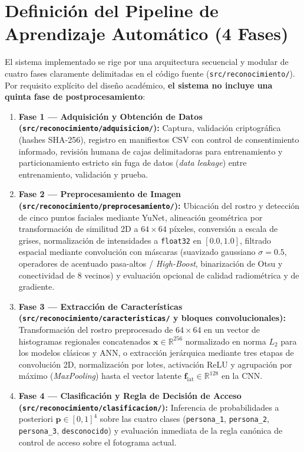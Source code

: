 \documentclass{article}
\begin{document}
\section{Definición del Pipeline de Aprendizaje Automático (4 Fases)}

El sistema implementado se rige por una arquitectura secuencial y modular de cuatro fases claramente delimitadas en el código fuente (\texttt{src/reconocimiento/}). Por requisito explícito del diseño académico, \textbf{el sistema no incluye una quinta fase de postprocesamiento}:

\begin{enumerate}
    \item \textbf{Fase 1 --- Adquisición y Obtención de Datos (\texttt{src/reconocimiento/adquisicion/}):} Captura, validación criptográfica (hashes SHA-256), registro en manifiestos CSV con control de consentimiento informado, revisión humana de cajas delimitadoras para entrenamiento y particionamiento estricto sin fuga de datos (\textit{data leakage}) entre entrenamiento, validación y prueba.
    \item \textbf{Fase 2 --- Preprocesamiento de Imagen (\texttt{src/reconocimiento/preprocesamiento/}):} Ubicación del rostro y detección de cinco puntos faciales mediante YuNet, alineación geométrica por transformación de similitud 2D a $64 \times 64$ píxeles, conversión a escala de grises, normalización de intensidades a \texttt{float32} en $[0.0, 1.0]$, filtrado espacial mediante convolución con máscaras (suavizado gaussiano $\sigma = 0.5$, operadores de acentuado pasa-altos / \textit{High-Boost}, binarización de Otsu y conectividad de 8 vecinos) y evaluación opcional de calidad radiométrica y de gradiente.
    \item \textbf{Fase 3 --- Extracción de Características (\texttt{src/reconocimiento/caracteristicas/} y bloques convolucionales):} Transformación del rostro preprocesado de $64 \times 64$ en un vector de histogramas regionales concatenados $\mathbf{x} \in \mathbb{R}^{256}$ normalizado en norma $L_2$ para los modelos clásicos y ANN, o extracción jerárquica mediante tres etapas de convolución 2D, normalización por lotes, activación ReLU y agrupación por máximo (\textit{MaxPooling}) hasta el vector latente $\mathbf{f}_{\text{lat}} \in \mathbb{R}^{128}$ en la CNN.
    \item \textbf{Fase 4 --- Clasificación y Regla de Decisión de Acceso (\texttt{src/reconocimiento/clasificacion/}):} Inferencia de probabilidades a posteriori $\mathbf{p} \in [0,1]^4$ sobre las cuatro clases (\texttt{persona\_1}, \texttt{persona\_2}, \texttt{persona\_3}, \texttt{desconocido}) y evaluación inmediata de la regla canónica de control de acceso sobre el fotograma actual.
\end{enumerate}
\end{document}
